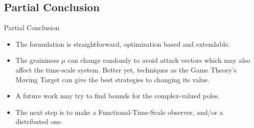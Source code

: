 
\subsection{Partial Conclusion}%
\label{subsec:ts-conclusion}

\begin{slide}{Partial Conclusion}
  \begin{itemize}
    \item The formulation is straightforward, optimization based and extendable.
    \item The graininess \(\mu\) can change randomly to avoid attack vectors
          which may also affect the time-scale system. Better yet, techniques as
          the Game Theory's Moving Target can give the best strategies to
          changing its value.
    \item A future work may try to find bounds for the complex-valued poles.
    \item The next step is to make a Functional-Time-Scale observer, and/or a
          distributed one.
  \end{itemize}
\end{slide}
